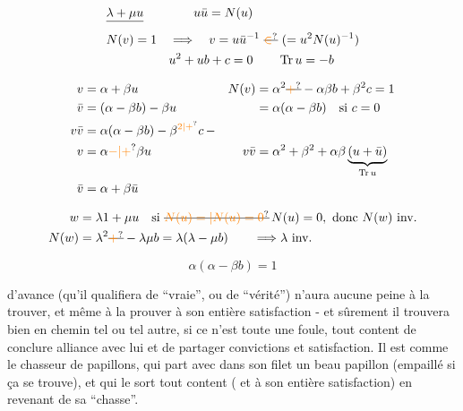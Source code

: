 \[
\begin{aligned}
&\deleted{\lambda+\mu u}\qquad\qquad u\bar u=N(u)\\
&N(v)=1\quad\Longrightarrow\quad v=u\bar u^{-1}\ \deleted{\unsure{\in}}\ (=u^2N(u)^{-1})\\
&\hspace{50pt}u^2+ub +c=0\qquad \operatorname{Tr}u=-b
\end{aligned}
\]

\[
\begin{aligned}
v&=\alpha+\beta u& N(v)&=\alpha^2\deleted{\unsure{+}}-\alpha\beta b+\beta^2c=1\\
\bar v&=(\alpha-\beta b)-\beta u&&=\alpha(\alpha-\beta b)\quad\text{si }c=0\\
v\bar v&=\alpha(\alpha-\beta b)-\beta^{\unsure{2|+}}c\,-\\
v&=\alpha\unsure{-|+}\beta u&v\bar v&=\alpha^2+\beta^2+\alpha\beta\underbrace{(u+\bar u)}_{\operatorname{Tr}u}\\
\bar v&=\alpha+\beta\bar u
\end{aligned}
\]

\[
\begin{aligned}
w&=\lambda1+\mu u\quad\text{si }\deleted{\unsure{N(u)=|N(u)=0}}\,N(u)=0,\ \text{donc }N(w)\ \text{inv.}\\
N(w)&=\lambda^2\deleted{\unsure{+}}-\lambda\mu b=\lambda(\lambda-\mu b)\qquad\Longrightarrow\lambda\ \text{inv.}
\end{aligned}
\]

\[\alpha(\alpha-\beta b)=1\]


 

d'avance (qu'il qualifiera de ``vraie'', ou de ``vérité'') n'aura aucune peine à la trouver, et même à la prouver à son entière satisfaction - et sûrement il trouvera bien en chemin tel ou tel autre, si ce n'est toute une foule, tout content de conclure alliance avec lui et de partager convictions et satisfaction. Il est comme le chasseur de papillons, qui part avec dans son filet un beau papillon (empaillé si ça se trouve), et qui le sort tout content ( et à son entière satisfaction) en revenant de sa ``chasse''.

